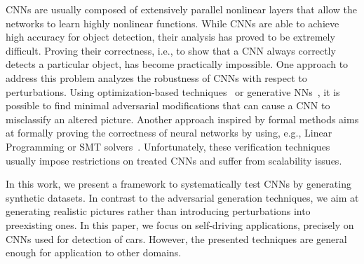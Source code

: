 \documentclass[10pt,journal,cspaper,final,twocolumn,compsoc]{./IEEEtran}
\begin{document}
CNNs are usually composed of extensively parallel nonlinear layers that 
allow the networks to learn highly nonlinear functions. While CNNs
are able to achieve high accuracy for object detection, their analysis has proved to be
extremely difficult. Proving their correctness, i.e.,
to show that a CNN always correctly detects a particular object, has become practically impossible. 
One approach to address this problem analyzes the robustness of CNNs with respect to perturbations.
Using optimization-based techniques~\cite{szegedy2013intriguing, papernot2016limitations} or generative NNs~\cite{goodfellow2014generative},
it is possible to find minimal adversarial modifications that can cause a CNN to misclassify an altered picture.
Another approach inspired by formal methods aims at formally proving the correctness of neural networks by using, e.g., Linear Programming or SMT solvers~\cite{huang2016safety, katz2017reluplex}.
Unfortunately, these verification techniques usually impose restrictions on treated CNNs and suffer from scalability issues.


In this work, we present a framework to
systematically test CNNs by generating synthetic datasets.
In contrast to the
adversarial generation techniques, we aim at generating realistic 
pictures rather than introducing perturbations into preexisting ones. In this paper,
we focus on self-driving applications, precisely on CNNs used for detection
of cars. However, the presented techniques are general enough for application to other domains.
\end{document}
